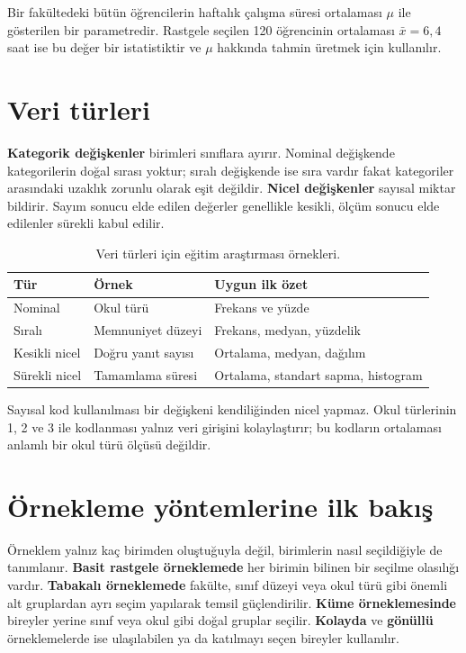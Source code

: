 Bir fakültedeki bütün öğrencilerin haftalık çalışma süresi ortalaması $\mu$
ile gösterilen bir parametredir. Rastgele seçilen 120 öğrencinin ortalaması
$\bar x=6{,}4$ saat ise bu değer bir istatistiktir ve $\mu$ hakkında tahmin
üretmek için kullanılır.

\section{Veri türleri}
\label{sec:population-data-types}

\textbf{Kategorik değişkenler} birimleri sınıflara ayırır. Nominal değişkende
kategorilerin doğal sırası yoktur; sıralı değişkende ise sıra vardır fakat
kategoriler arasındaki uzaklık zorunlu olarak eşit değildir.
\textbf{Nicel değişkenler} sayısal miktar bildirir. Sayım sonucu elde edilen
değerler genellikle kesikli, ölçüm sonucu elde edilenler sürekli kabul edilir.

\begin{table}[H]
\centering
\caption{Veri türleri için eğitim araştırması örnekleri.}
\label{tab:data-type-examples}
\begin{tabularx}{\textwidth}{@{}p{}XX@{}}
\toprule
Tür & Örnek & Uygun ilk özet \\
\midrule
Nominal & Okul türü & Frekans ve yüzde \\
Sıralı & Memnuniyet düzeyi & Frekans, medyan, yüzdelik \\
Kesikli nicel & Doğru yanıt sayısı & Ortalama, medyan, dağılım \\
Sürekli nicel & Tamamlama süresi & Ortalama, standart sapma, histogram \\
\bottomrule
\end{tabularx}
\end{table}

Sayısal kod kullanılması bir değişkeni kendiliğinden nicel yapmaz. Okul
türlerinin 1, 2 ve 3 ile kodlanması yalnız veri girişini kolaylaştırır; bu
kodların ortalaması anlamlı bir okul türü ölçüsü değildir.

\section{Örnekleme yöntemlerine ilk bakış}
\label{sec:population-sampling-intro}

Örneklem yalnız kaç birimden oluştuğuyla değil, birimlerin nasıl seçildiğiyle
de tanımlanır. \textbf{Basit rastgele örneklemede} her birimin bilinen bir
seçilme olasılığı vardır. \textbf{Tabakalı örneklemede} fakülte, sınıf düzeyi
veya okul türü gibi önemli alt gruplardan ayrı seçim yapılarak temsil
güçlendirilir. \textbf{Küme örneklemesinde} bireyler yerine sınıf veya okul
gibi doğal gruplar seçilir. \textbf{Kolayda} ve \textbf{gönüllü}
örneklemelerde ise ulaşılabilen ya da katılmayı seçen bireyler kullanılır.

